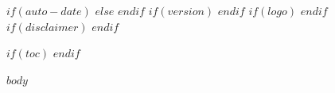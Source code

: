 \documentclass[$if(fontsize)$$fontsize$$else$11pt$endif$]{article}
\begin{document}
\newcommand{\doctitle}{$title$}
\newcommand{\docauthor}{$author$}
$if(auto-date)$
\newcommand{\docdate}{\today}
$else$
\newcommand{\docdate}{$date$}
$endif$
$if(version)$
\newcommand{\docversion}{$version$}
$endif$
$if(logo)$
\newcommand{\doclogo}{$logo$}
$endif$
$if(disclaimer)$
\newcommand{\docdisclaimer}{$disclaimer$}
$endif$
\newcommand{\doclogowidth}{$if(logo-width)$$logo-width$$else$0.8$endif$}
\newcommand{\doctppostrule}{$if(titlepage-post-rule)$$titlepage-post-rule$$else$2em$endif$}
\newcommand{\doctpposttitle}{$if(titlepage-post-title)$$titlepage-post-title$$else$0.75em$endif$}
\newcommand{\doctppostauthor}{$if(titlepage-post-author)$$titlepage-post-author$$else$0.5em$endif$}
\newcommand{\doctppostdate}{$if(titlepage-post-date)$$titlepage-post-date$$else$3em$endif$}


$if(toc)$
\renewcommand{\contentsname}{Table of Contents}
\setcounter{tocdepth}{$if(toc-depth)$$toc-depth$$else$3$endif$}
\tableofcontents
\newpage
$endif$

$body$
\end{document}
